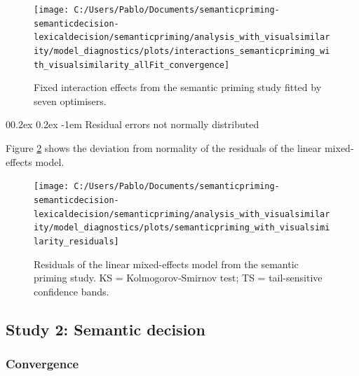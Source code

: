 \documentclass[
  12pt,
  man,floatsintext]{apa7}
\makeatletter
\let\oldparagraph\paragraph
\renewcommand{\paragraph}[1]{\oldparagraph{#1}\mbox{}}
\renewcommand{\paragraph}{\@startsection{paragraph}{4}{\parindent}%
  {0\baselineskip \@plus 0.2ex \@minus 0.2ex}%
  {-1em}%
  {\normalfont\normalsize\bfseries\itshape\typesectitle}}
\makeatother
\begin{document}
\begin{figure}

{\centering \texttt{[image: C:/Users/Pablo/Documents/semanticpriming-semanticdecision-lexicaldecision/semanticpriming/analysis\_with\_visualsimilarity/model\_diagnostics/plots/interactions\_semanticpriming\_with\_visualsimilarity\_allFit\_convergence]} 

}

\caption{Fixed interaction effects from the semantic priming study fitted by seven optimisers.}\label{fig:interactions-semanticpriming-with-visualsimilarity-allFit-convergence}
\end{figure}

\hypertarget{residual-errors-not-normally-distributed-2}{%
\paragraph{Residual errors not normally distributed}\label{residual-errors-not-normally-distributed-2}}

Figure \ref{fig:semanticpriming-with-visualsimilarity-residuals} shows the deviation from normality of the residuals of the linear mixed-effects model.

\begin{figure}

{\centering \texttt{[image: C:/Users/Pablo/Documents/semanticpriming-semanticdecision-lexicaldecision/semanticpriming/analysis\_with\_visualsimilarity/model\_diagnostics/plots/semanticpriming\_with\_visualsimilarity\_residuals]} 

}

\caption{Residuals of the linear mixed-effects model from the semantic priming study. \linebreak KS = Kolmogorov-Smirnov test; TS = tail-sensitive confidence bands.}\label{fig:semanticpriming-with-visualsimilarity-residuals}
\end{figure}

\hypertarget{study-2-semantic-decision-2}{%
\subsection{Study 2: Semantic decision}\label{study-2-semantic-decision-2}}

\hypertarget{convergence-4}{%
\subsubsection{Convergence}\label{convergence-4}}
\end{document}
